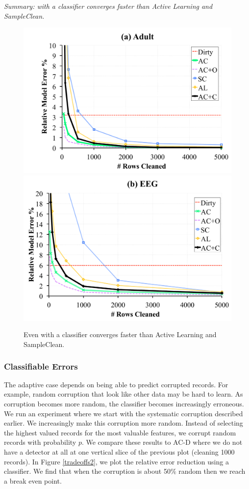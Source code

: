 \vspace{0.25em}

\noindent \emph{Summary: \sys with a classifier converges faster than Active Learning and SampleClean.}

\begin{figure}[t]
\centering
 \includegraphics[width=0.49\columnwidth]{exp/exp11a.pdf}
 \includegraphics[width=0.49\columnwidth]{exp/exp11b.pdf}
 \caption{Even with a classifier \sys converges faster than Active Learning and SampleClean. \label{pred-perf}}
\end{figure}

\subsubsection{Classifiable Errors}
The adaptive case depends on being able to predict corrupted records.
For example, random corruption that look like other data may be hard to learn.
As corruption becomes more random, the classifier becomes increasingly erroneous.
We run an experiment where we start with the systematic corruption described earlier.
We increasingly make this corruption more random.
Instead of selecting the highest valued records for the most valuable features, we corrupt random records with probability $p$. 
We compare these results to AC-D where we do not have a detector at all at one vertical slice of the previous plot (cleaning 1000 records).
In Figure \ref{tradeoffs2}, we plot the relative error reduction using a classifier.
We find that when the corruption is about 50\% random then we reach a break even point.


